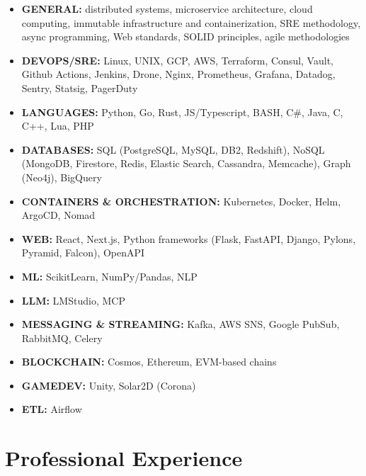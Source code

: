 \documentclass[12pt,a4paper]{article}
\begin{document}
\begin{itemize}
  \item \textbf{GENERAL:} distributed systems, microservice architecture, cloud computing, immutable infrastructure and containerization, SRE methodology, async programming, Web standards, SOLID principles, agile methodologies

  \item \textbf{DEVOPS/SRE:} Linux, UNIX, GCP, AWS, Terraform, Consul, Vault, Github Actions, Jenkins, Drone, Nginx, Prometheus, Grafana, Datadog, Sentry, Statsig, PagerDuty

  \item \textbf{LANGUAGES:} Python, Go, Rust, JS/Typescript, BASH, C\#, Java, C, C++, Lua, PHP

  \item \textbf{DATABASES:} SQL (PostgreSQL, MySQL, DB2, Redshift), NoSQL (MongoDB, Firestore, Redis, Elastic Search, Cassandra, Memcache), Graph (Neo4j), BigQuery
  
  \item \textbf{CONTAINERS \& ORCHESTRATION:} Kubernetes, Docker, Helm, ArgoCD, Nomad

  \item \textbf{WEB:} React, Next.js, Python frameworks (Flask, FastAPI, Django, Pylons, Pyramid, Falcon), OpenAPI

  \item \textbf{ML:} ScikitLearn, NumPy/Pandas, NLP

  \item \textbf{LLM:} LMStudio, MCP

  \item \textbf{MESSAGING \& STREAMING:} Kafka, AWS SNS, Google PubSub, RabbitMQ, Celery

  \item \textbf{BLOCKCHAIN:} Cosmos, Ethereum, EVM-based chains

  \item \textbf{GAMEDEV:} Unity, Solar2D (Corona)

  \item \textbf{ETL:} Airflow
\end{itemize}

\section{Professional Experience}
\end{document}
